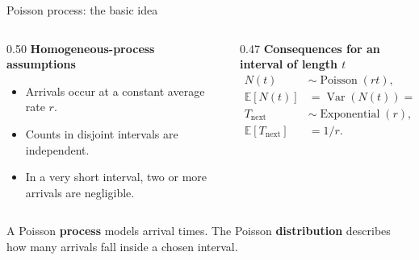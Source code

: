 \documentclass{beamer}
\begin{document}
\begin{frame}{Poisson process: the basic idea}
  \centering

  \vspace{0.5em}
  \begin{columns}[T,onlytextwidth]
    \begin{column}{0.50\textwidth}
      \textbf{Homogeneous-process assumptions}
      \begin{itemize}
        \item Arrivals occur at a constant average rate $r$.
        \item Counts in disjoint intervals are independent.
        \item In a very short interval, two or more arrivals are negligible.
      \end{itemize}
    \end{column}
    \begin{column}{0.47\textwidth}
      \small
      \textbf{Consequences for an interval of length $t$}
      \begin{align*}
        N(t)&\sim\operatorname{Poisson}(rt),\\
        \mathbb E[N(t)]&=\operatorname{Var}(N(t))=rt,\\
        T_{\mathrm{next}}&\sim\operatorname{Exponential}(r),\\
        \mathbb E[T_{\mathrm{next}}]&=1/r.
      \end{align*}
    \end{column}
  \end{columns}

  \vspace{0.3em}
  \small A Poisson \textbf{process} models arrival times. The Poisson \textbf{distribution} describes how many arrivals fall inside a chosen interval.
\end{frame}
\end{document}
